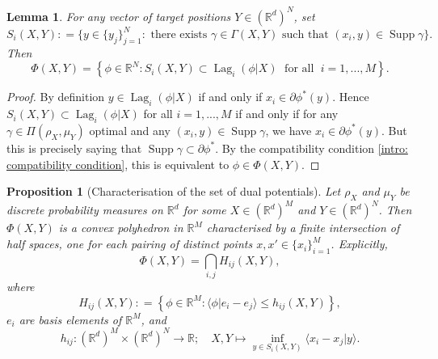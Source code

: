 \documentclass[11pt, oneside, titlepage]{book}
\theoremstyle{plain}
\newtheorem{lemma}[theorem]{Lemma}
\newtheorem{proposition}[theorem]{Proposition}
\theoremstyle{definition}
\newcommand{\R}{\mathbb{R}}
\DeclareMathOperator{\supp}{Supp}
\DeclareMathOperator{\lag}{Lag}
\begin{document}
\begin{lemma}
\label{lem: dual vect opt iff all Si}
For any vector of target positions $Y \in (\R^d)^N$, set
\begin{equation}
    S_i(X,Y) : = \{  y \in \{y_j\}_{j=1}^N: \text{ there exists } \gamma \in \Gamma(X,Y) \text{ such that } (x_i, y) \in \supp \gamma\}.
\end{equation}
Then
\begin{equation*}
    \Phi(X,Y) = \left\{ \phi \in \R^N : S_i(X,Y) \subset \lag_i(\phi | X) \;\text{ for all }\; i = 1,...,M \right\}.
\end{equation*}
\end{lemma}
\begin{proof}
By definition $y \in \lag_i(\phi |X)$ if and only if $x_i \in \partial \phi^*(y)$. Hence $S_i(X,Y) \subset \lag_i(\phi | X)$ for all $i=1,...,M$ if and only if for any $\gamma \in \Pi(\rho_X, \mu_Y)$ optimal and any $(x_i, y) \in \supp \gamma$, we have $x_i \in \partial \phi^*(y)$. But this is precisely saying that $\supp \gamma \subset \partial \phi^*$. By the compatibility condition \eqref{intro: compatibility condition}, this is equivalent to $\phi \in \Phi(X,Y)$.
\end{proof}



\begin{proposition}[Characterisation of the set of dual potentials]
\label{prop: dual set characterisation}
Let $\rho_X$ and $\mu_Y$ be discrete probability measures on $\R^d$ for some $X \in (\R^d)^M$ and $Y \in (\R^d)^N$. Then $\Phi(X, Y)$ is a convex polyhedron in $\R^M$ characterised by a finite intersection of half spaces, one for each pairing of distinct points $x, x' \in \{x_i\}_{i=1}^M$. Explicitly,
\begin{equation}
\label{eq: characterisation of set of dual potentials as intersection of hyperplanes}
    \Phi(X,Y) = \bigcap_{i, j} H_{ij}(X,Y),
\end{equation}
where
\begin{equation}
\label{eq: Hijx hyperplane definition}
    H_{ij}(X,Y): = \left\{ \phi \in \R^M : \langle \phi | e_i - e_j \rangle \leq h_{ij}(X,Y) \right\},
\end{equation}
$e_i$ are basis elements of $\R^M$, and
\begin{equation*}
    h_{ij} : (\R^d)^M \times (\R^d)^N \to \R; \quad X, Y \mapsto \inf_{y \in S_i(X,Y)} \langle x_i - x_j | y \rangle.
\end{equation*}
\end{proposition}
\end{document}
